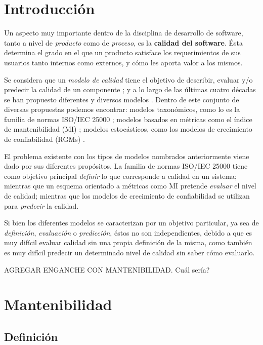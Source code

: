 \section{Introducción}

Un aspecto muy importante dentro de la disciplina de desarrollo de software, tanto
a nivel de \textit{producto} como de \textit{proceso}, es la \textbf{calidad del
software}.
Ésta determina el grado en el que un producto satisface los requerimientos de sus usuarios
tanto internos como externos, y cómo les aporta valor a los mismos.

Se considera que un \textit{modelo de calidad} tiene el objetivo de describir, evaluar y/o
predecir la calidad de un componente \cite{Wagner2013}; y a lo largo de las últimas cuatro
décadas se han propuesto diferentes y diversos modelos \cite{Deissenboeck2009}.
Dentro de este conjunto de diversas propuestas podemos encontrar: modelos taxonómicos, como
lo es la familia de normas ISO/IEC 25000 \cite{ref}; modelos basados en métricas como el
índice de mantenibilidad (MI) \cite{ref}; modelos estocásticos, como los modelos de crecimiento
de confiabilidad (RGMs) \cite{ref}.

El problema existente con los tipos de modelos nombrados anteriormente viene dado por sus
diferentes propósitos.
La familia de normas ISO/IEC 25000 tiene como objetivo principal \textit{definir} lo que
corresponde a calidad en un sistema; mientras que un esquema orientado a métricas como MI
pretende \textit{evaluar} el nivel de calidad; mientras que los modelos de crecimiento de
confiabilidad se utilizan para \textit{predecir} la calidad.

Si bien los diferentes modelos se caracterizan por un objetivo particular, ya sea de
\textit{definición}, \textit{evaluación} o \textit{predicción}, éstos no son independientes,
debido a que es muy difícil evaluar calidad sin una propia definición de la misma, como también
es muy difícil predecir un determinado nivel de calidad sin saber cómo evaluarlo.

AGREGAR ENGANCHE CON MANTENIBILIDAD.
Cuál sería?

\section{Mantenibilidad}

\subsection{Definición}

